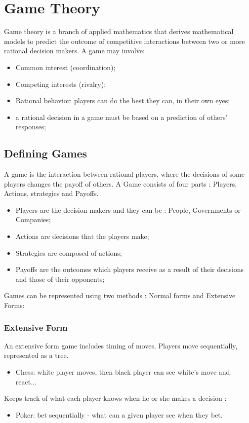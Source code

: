 \section{Game Theory}
Game theory is a branch of applied mathematics that derives mathematical models to predict the outcome of competitive interactions between two or more rational decision makers. A game may involve: 
\begin{itemize}
\item Common interest (coordination);
\item Competing interests (rivalry);
\item Rational behavior: players can do the best they can, in their own eyes;
\item a rational decision in a game must be based on a prediction of others' responses;
\end{itemize}
\clearpage
 

\subsection{Defining Games} 
A game is the interaction between rational players, where the decisions of some players changes the payoff of others. A Game consists of four parts : 
Players, Actions, strategies and Payoffs.
\begin{itemize}
\item Players are the decision makers and they can be : People, Governments or Companies;
\item Actions are decisions that the players make;
\item Strategies are composed of actions;
\item Payoffs are the outcomes which players receive as a result of their decisions and those of their opponents;
\end{itemize}
Games can be represented using two methods : Normal forms and Extensive Forms:
\subsubsection{Extensive Form}
An extensive form game includes timing of moves. 
Players move sequentially, represented as a tree.
\begin{itemize}
\item Chess: white player moves, then black player can see white's move and react...
\end{itemize}
Keeps track of what each player knows when he or she makes a decision :
\begin{itemize}
\item Poker: bet sequentially - what can a given player see when they bet. 
\end{itemize}

